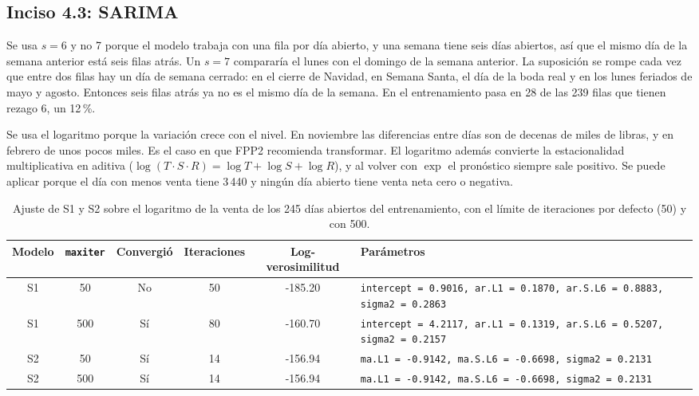\documentclass[11pt]{article}
\begin{document}
\subsection*{Inciso 4.3: SARIMA}

Se usa $s=6$ y no 7 porque el modelo trabaja con una fila por día abierto, y una semana
tiene seis días abiertos, así que el mismo día de la semana anterior está seis filas atrás. Un
$s=7$ compararía el lunes con el domingo de la semana anterior. La suposición se rompe cada vez
que entre dos filas hay un día de semana cerrado: en el cierre de Navidad, en Semana Santa, el día
de la boda real y en los lunes feriados de mayo y agosto. Entonces seis filas atrás ya no es el
mismo día de la semana. En el entrenamiento pasa en 28 de las 239 filas que tienen rezago 6, un
12\,\%.

Se usa el logaritmo porque la variación crece con el nivel. En noviembre las diferencias
entre días son de decenas de miles de libras, y en febrero de unos pocos miles. Es el caso en que
FPP2 recomienda transformar. El logaritmo además convierte la estacionalidad multiplicativa en
aditiva ($\log(T\cdot S\cdot R)=\log T+\log S+\log R$), y al volver con $\exp$ el pronóstico
siempre sale positivo. Se puede aplicar porque el día con menos venta tiene \textsterling{}3\,440 y ningún día
abierto tiene venta neta cero o negativa.

\begin{table}[H]
\centering
\caption{Ajuste de S1 y S2 sobre el logaritmo de la venta de los 245 días abiertos del
entrenamiento, con el límite de iteraciones por defecto (50) y con 500.}\label{tab:sarima}
\small
\begin{tabular}{|c|c|c|c|c|p{5.6cm}|}
\hline
Modelo & \texttt{maxiter} & Convergió & Iteraciones & Log-verosimilitud & Parámetros \\
\hline
S1 & 50 & No & 50 & -185.20 & \texttt{intercept = 0.9016, ar.L1 = 0.1870, ar.S.L6 = 0.8883, sigma2 = 0.2863} \\
S1 & 500 & Sí & 80 & -160.70 & \texttt{intercept = 4.2117, ar.L1 = 0.1319, ar.S.L6 = 0.5207, sigma2 = 0.2157} \\
S2 & 50 & Sí & 14 & -156.94 & \texttt{ma.L1 = -0.9142, ma.S.L6 = -0.6698, sigma2 = 0.2131} \\
S2 & 500 & Sí & 14 & -156.94 & \texttt{ma.L1 = -0.9142, ma.S.L6 = -0.6698, sigma2 = 0.2131} \\
\hline
\end{tabular}
\end{table}
\end{document}
